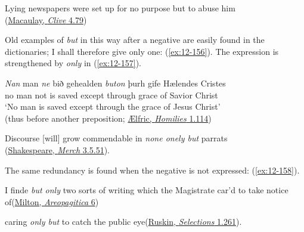 \ea \label{ex:12-155}
Lying newspapers were set up for no purpose but to abuse him\\\hfill(\href{https://books.google.com/books?id=hMTX7ieTNr8C&pg=PA440&lpg=PA440&dq=%22lying+newspapers%22+macaulay&source=bl&ots=ep17tivPsS&sig=ACfU3U0dJqAZqe9-CkU02aYZqB6BRBC1dA&hl=en&sa=X&ved=2ahUKEwid-9yOyoaFAxWrna8BHSZAAFoQ6AF6BAgJEAM#v=onepage&q=%22lying%20newspapers%22%20macaulay&f=false}{Macaulay, \textit{Clive} 4.79})
\z


Old examples of \textit{but} in this way after a negative are easily found in the dictionaries; I shall therefore give only one: (\ref{ex:12-156}). The expression is strengthened by \textit{only} in (\ref{ex:12-157}).

\ea \label{ex:12-156}
\gll \emph{Nan} man \emph{ne} bið gehealden \emph{buton} þurh gife Hælendes Cristes\\
no man not is saved except through grace {of Savior} Christ\\
\glt `No man is saved except through the grace of Jesus Christ'
\\\hfill(thus before another preposition; \href{https://archive.org/details/homiliesanglosa00thorgoog/page/114/mode/2up?q=%22gehealden+buton%22&view=theater}{Ælfric, \textit{Homilies} 1.114})
\z

\ea \label{ex:12-157}
Discourse [will] grow commendable in \emph{none onely but} parrats\\\hfill(\href{https://internetshakespeare.uvic.ca/doc/MV_F1/scene/3.5/index.html#tln-1855}{Shakespeare, \textit{Merch} 3.5.51}).
\z

The same redundancy is found when the negative is not expressed: (\ref{ex:12-158}).

\ea \label{ex:12-158}
\ea
I finde \emph{but only} two sorts of writing which the Magistrate car'd to take notice of\hfill(\href{https://archive.org/details/areopagitica00miltuoft/page/6/mode/2up?q=%22finde+but+only%22&view=theater}{Milton, \textit{Areopagitica} 6})

\ex caring \emph{only but} to catch the public eye\hfill(\href{https://books.google.co.jp/books?id=FFsVAAAAYAAJ&pg=PA279&lpg=PA279&dq=%22touch+of+vandyck%27s+pencil%22&source=bl&ots=a1In7lwdDy&sig=ACfU3U14w7RuGX53hktleahVVxLgOhqEvg&hl=en&sa=X&ved=2ahUKEwjz2ZCg_b2FAxUrr1YBHTteAXcQ6AF6BAgIEAM#v=snippet&q=%22catch%20the%20public%20eye%22&f=false}{Ruskin, \textit{Selections} 1.261}).
\z
\z

